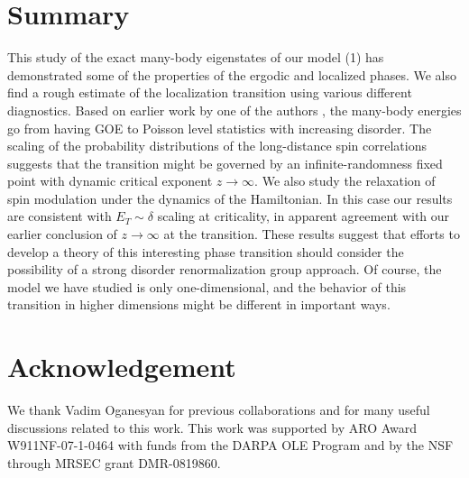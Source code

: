 \documentclass[letterpaper, twocolumn,superscriptaddress, showpacs,preprintnumbers,amsmath,amssymb]{revtex4}
\begin{document}
\section{Summary}

This study of the exact many-body eigenstates of our model (1) has demonstrated some of the properties of the ergodic and localized phases. We also find a rough estimate of the localization transition using various different diagnostics. Based on earlier work by one of the authors \cite{OHED}, the many-body energies go from having GOE to Poisson level statistics with increasing disorder. The scaling of the probability distributions of the long-distance spin correlations suggests that the transition might be governed by an infinite-randomness fixed point with dynamic critical exponent $z\rightarrow\infty$. We also study the relaxation of spin modulation under the dynamics of the Hamiltonian. In this case our results are consistent with $E_T \sim\delta$ scaling at criticality, in apparent agreement with our earlier conclusion of $z\rightarrow\infty$ at the transition. These results suggest that efforts to develop a theory of this interesting phase transition should consider the
possibility of a strong disorder renormalization group approach.
Of course, the model we have studied is only one-dimensional, and the behavior of this transition in
higher dimensions might be different in important ways.

\section{Acknowledgement}

We thank Vadim Oganesyan for previous collaborations and for many useful discussions related to this work.
This work was supported by ARO Award W911NF-07-1-0464 with funds from the
DARPA OLE Program and by the NSF
through MRSEC grant DMR-0819860.
\end{document}
